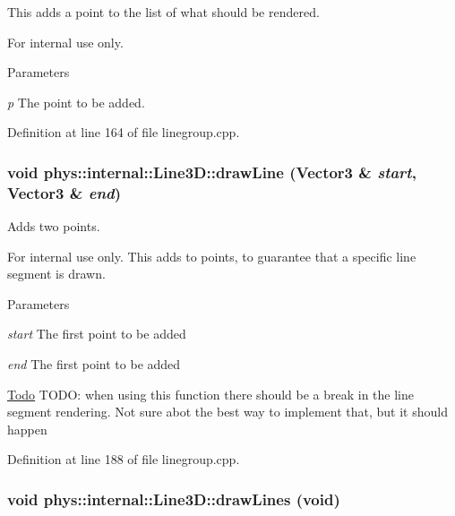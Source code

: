 This adds a point to the list of what should be rendered. 

\begin{DoxyInternal}{For internal use only.}

\begin{DoxyParams}{Parameters}
\item[{\em p}]The point to be added. \end{DoxyParams}
\end{DoxyInternal}


Definition at line 164 of file linegroup.cpp.

\hypertarget{classphys_1_1internal_1_1Line3D_a0320e600b9f363036c63eb47527bb854}{
\subsubsection[{drawLine}]{\setlength{\rightskip}{0pt plus 5cm}void phys::internal::Line3D::drawLine (Vector3 \& {\em start}, \/  Vector3 \& {\em end})}}
\label{d4/db5/classphys_1_1internal_1_1Line3D_a0320e600b9f363036c63eb47527bb854}


Adds two points. 

\begin{DoxyInternal}{For internal use only.}
This adds to points, to guarantee that a specific line segment is drawn. 
\begin{DoxyParams}{Parameters}
\item[{\em start}]The first point to be added \item[{\em end}]The first point to be added \end{DoxyParams}
\end{DoxyInternal}


\begin{Desc}
\item[\hyperlink{todo__todo000008}{Todo}]TODO: when using this function there should be a break in the line segment rendering. Not sure abot the best way to implement that, but it should happen \end{Desc}




Definition at line 188 of file linegroup.cpp.

\hypertarget{classphys_1_1internal_1_1Line3D_a008f0874c2213002e0c39330561f80f2}{
\subsubsection[{drawLines}]{\setlength{\rightskip}{0pt plus 5cm}void phys::internal::Line3D::drawLines (void)}}
\label{d4/db5/classphys_1_1internal_1_1Line3D_a008f0874c2213002e0c39330561f80f2}


